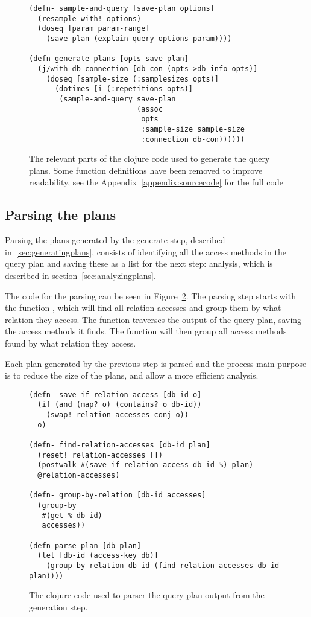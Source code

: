 \begin{figure}[ht]
  \begin{verbatim}
(defn- sample-and-query [save-plan options]
  (resample-with! options)
  (doseq [param param-range]
    (save-plan (explain-query options param))))

(defn generate-plans [opts save-plan]
  (j/with-db-connection [db-con (opts->db-info opts)]
    (doseq [sample-size (:samplesizes opts)]
      (dotimes [i (:repetitions opts)]
       (sample-and-query save-plan
                         (assoc
                          opts
                          :sample-size sample-size
                          :connection db-con))))))
   \end{verbatim}
   \caption[The clojure code to generate a query]{The relevant parts of the
     clojure code used to generate the query plans. Some function definitions
     have been removed to improve readability, see the
     Appendix~\ref{appendix:sourcecode} for the full code}
\label{fig:clj:generating}
\end{figure}

\subsection{Parsing the plans}\label{sec:parsing}
Parsing the plans generated by the generate step, described
in~\ref{sec:generatingplans}, consists of identifying all the access
methods in the query plan and saving these as a list for the next step:
analysis, which is described in section~\ref{sec:analyzingplans}.

The code for the parsing can be seen in Figure~\ref{fig:clj:parsing}. The
parsing step starts with the function , which will find all
relation accesses and group them by what relation they access. The function
 traverses the output of the query plan, saving
the access methods it finds. The function  will then
group all access methods found by what relation they access.

Each plan generated by the previous step is parsed and the process main purpose
is to reduce the size of the plans, and allow a more efficient analysis.

\begin{figure}[ht]
\begin{verbatim}
(defn- save-if-relation-access [db-id o]
  (if (and (map? o) (contains? o db-id))
    (swap! relation-accesses conj o))
  o)

(defn- find-relation-accesses [db-id plan]
  (reset! relation-accesses [])
  (postwalk #(save-if-relation-access db-id %) plan)
  @relation-accesses)

(defn- group-by-relation [db-id accesses]
  (group-by
   #(get % db-id)
   accesses))

(defn parse-plan [db plan]
  (let [db-id (access-key db)]
    (group-by-relation db-id (find-relation-accesses db-id plan))))
   \end{verbatim}
   \caption[The clojure code to parse a query]{The clojure code used to parser
     the query plan output from the generation step.}
\label{fig:clj:parsing}
\end{figure}

